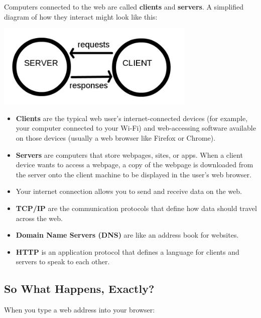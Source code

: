 \documentclass[
]{book}
\providecommand{\tightlist}{%
  \setlength{\itemsep}{0pt}\setlength{\parskip}{0pt}}
\begin{document}
Computers connected to the web are called \textbf{clients} and \textbf{servers}. A simplified diagram of how they interact might look like this:

\includegraphics{Python/PythonWebScrape/images/client_server.png}

\begin{itemize}
\tightlist
\item
  \textbf{Clients} are the typical web user's internet-connected devices (for example, your computer connected to your Wi-Fi) and web-accessing software available on those devices (usually a web browser like Firefox or Chrome).
\item
  \textbf{Servers} are computers that store webpages, sites, or apps. When a client device wants to access a webpage, a copy of the webpage is downloaded from the server onto the client machine to be displayed in the user's web browser.
\item
  Your internet connection allows you to send and receive data on the web.
\item
  \textbf{TCP/IP} are the communication protocols that define how data should travel across the web.
\item
  \textbf{Domain Name Servers (DNS)} are like an address book for websites.
\item
  \textbf{HTTP} is an application protocol that defines a language for clients and servers to speak to each other.
\end{itemize}

\hypertarget{so-what-happens-exactly}{%
\subsection{So What Happens, Exactly?}\label{so-what-happens-exactly}}

When you type a web address into your browser:
\end{document}
